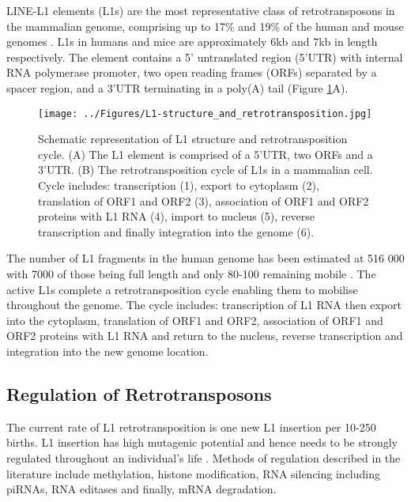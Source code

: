 \documentclass[12pt]{article}
\begin{document}
			LINE-L1 elements (L1s) are the most representative class of retrotransposons in the mammalian genome, comprising up to 17\% and 19\% of the human and mouse genomes \citep{Belancio08,Bodak14,Graham06}. L1s in humans and mice are approximately 6kb and 7kb in length respectively. The element contains a 5' untranslated region (5'UTR) with internal RNA polymerase promoter, two open reading frames (ORFs) separated by a spacer region, and a 3'UTR terminating in a poly(A) tail (Figure \ref{L1-structure-RT}A)\citep{Belancio07,Bodak14}.
			
				\begin{figure}[tb] %
					\centering
					\texttt{[image: ../Figures/L1-structure\_and\_retrotransposition.jpg]}
					\caption{Schematic representation of L1 structure and retrotransposition cycle. (A) The L1 element is comprised of a 5'UTR, two ORFs and a 3'UTR. (B) The retrotransposition cycle of L1s in a mammalian cell. Cycle includes: transcription (1), export to cytoplasm (2), translation of ORF1 and ORF2 (3), association of ORF1 and ORF2 proteins with L1 RNA (4), import to nucleus (5), reverse transcription and finally integration into the genome (6). \citep[adapted from:][]{Bodak14}}
					\label{L1-structure-RT}
				\end{figure}

			The number of L1 fragments in the human genome has been estimated at 516 000 \citep{Lander01} with 7000 of those being full length \citep{Khan03} and only 80-100 remaining mobile \citep{Brouha03}. The active L1s complete a retrotransposition cycle enabling them to mobilise throughout the genome. The cycle includes: transcription of L1 RNA then export into the cytoplasm, translation of ORF1 and ORF2, association of ORF1 and ORF2 proteins with L1 RNA and return to the nucleus, reverse transcription and integration into the new genome location. 
			


		\subsection{Regulation of Retrotransposons}
		
			The current rate of L1 retrotransposition is one new L1 insertion per 10-250 births. L1 insertion has high mutagenic potential and hence needs to be strongly regulated throughout an individual's life \citep{Castaneda11}. Methods of regulation described in the literature include methylation, histone modification, RNA silencing including piRNAs, RNA editases and finally, mRNA degradation. 
			
\end{document}
